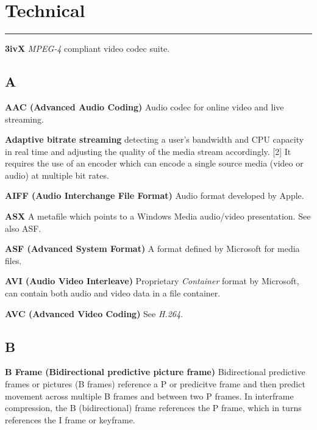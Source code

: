 \section{Technical}
\hrule

\medskip

\textbf{3ivX}
\textit{MPEG-4} compliant video codec suite.

\subsection{A}

\smallskip
\textbf{AAC (Advanced Audio Coding)}
Audio codec for online video and live streaming.

\smallskip
\textbf{Adaptive bitrate streaming}
detecting a user's bandwidth and CPU capacity in real time and adjusting the quality of the media stream accordingly. [2] It requires the use of an encoder which can encode a single source media (video or audio) at multiple bit rates.

\smallskip
\textbf{AIFF (Audio Interchange File Format)}
Audio format developed by Apple.

\smallskip
\textbf{ASX}
A metafile which points to a Windows Media audio/video presentation. See also ASF.

\smallskip
\textbf{ASF (Advanced System Format)}
A format defined by Microsoft for media files.

\smallskip
\textbf{AVI (Audio Video Interleave)}
Proprietary \textit{Container} format by Microsoft, can contain both audio and video data in a file container.

\smallskip
\textbf{AVC (Advanced Video Coding)}
See \textit{H.264}.

\subsection{B}

\smallskip
\textbf{B Frame (Bidirectional predictive picture frame)}
Bidirectional predictive frames or pictures (B frames) reference a P or predicitve frame and then predict movement across multiple B frames and between two P frames. In interframe compression, the B (bidirectional) frame references the P frame, which in turns references the I frame or keyframe.


